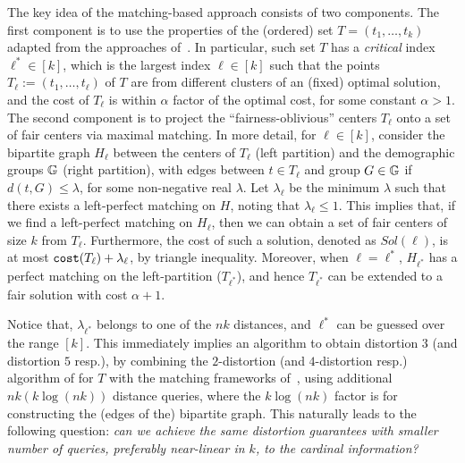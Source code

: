 The key idea of the matching-based approach consists of two components. 
The first component is to use the properties of the (ordered) set $T=(t_1,\dots,t_k)$ adapted from the approaches of~\citet{gonzalez1985clustering}.  
In particular, such set $T$ has a \emph{critical} index $\ell^* \in [k]$, which is the largest index $\ell \in [k]$ such that the points $T_\ell := (t_1,\dots,t_\ell)$ of $T$ are from different clusters of an (fixed) optimal solution, and the cost of $T_\ell$ is within $\alpha$ factor of the optimal cost, for some constant $\alpha>1$. 
The second component is to project the ``fairness-oblivious'' centers $T_{\ell}$ onto a set of fair centers via maximal matching. 
In more detail, for $\ell \in [k]$, consider the bipartite graph $H_\ell$ between the centers of $T_{\ell}$ (left partition) and the demographic groups $\mathbb{G}$ (right partition), with edges between $t \in T_{\ell}$ and group $G \in \mathbb{G}$ if $d(t,G) \le \lambda$, for some non-negative real $\lambda$.
Let $\lambda_{\ell}$ be the minimum $\lambda$ such that there exists a left-perfect matching on $H$, noting that $\lambda_\ell\le 1$.
This implies that, if we find a left-perfect matching on $H_\ell$, then we can obtain a set of fair centers of size $k$ from $T_{\ell}$.
Furthermore, the cost of such a solution, denoted as $Sol(\ell)$, is at most $\texttt{cost}(T_{\ell}) + \lambda_{\ell}$, by triangle inequality.
Moreover, when $\ell = \ell^*$, $H_{\ell^*}$ has a perfect matching on the left-partition ($T_{\ell^*}$), and hence $T_{\ell^*}$ can be extended to a fair solution with cost $\alpha+1$.



Notice that, $\lambda_{\ell^*}$ belongs to one of the $nk$ distances, and $\ell^{*}$ can be guessed over the range $[k]$.
This immediately implies an algorithm to obtain distortion $3$ (and distortion $5$ resp.), by combining the $2$-distortion (and $4$-distortion resp.) algorithm of \cite{burkhardt2024low} for $T$ with the matching frameworks of~\cite{jones2020fair,gadekar2025fair}, using additional $nk(k\log (nk))$ distance queries, where the $k \log (nk)$ factor is for constructing the (edges of the) bipartite graph. 
This naturally leads to the following question: \emph{can we achieve the same distortion guarantees with smaller number of queries, preferably near-linear in $k$, to the cardinal information?}

\vspace{1em}



